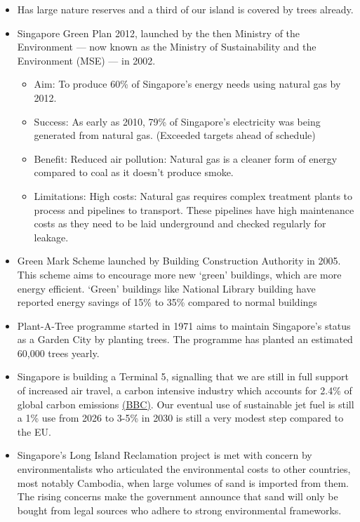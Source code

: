 \documentclass[oneside]{book}
\begin{document}
\begin{enumerate}
\begin{itemize}
\begin{itemize}
            \item Has large nature reserves and a third of our island is covered by trees already.
            \item Singapore Green Plan 2012, launched by the then Ministry of the Environment --- now known as the Ministry of Sustainability and the Environment (MSE) --- in 2002. 
            \begin{itemize}
                \item Aim: To produce 60\% of Singapore's energy needs using natural gas by 2012. 
                \item Success: As early as 2010, 79\% of Singapore's electricity was being generated from natural gas. (Exceeded targets ahead of schedule)
                \item Benefit: Reduced air pollution: Natural gas is a cleaner form of energy compared to coal as it doesn't produce smoke.
                \item Limitations: High costs: Natural gas requires complex treatment plants to process and pipelines to transport. These pipelines have high maintenance costs as they need to be laid underground and checked regularly for leakage. 
            \end{itemize}
            \item Green Mark Scheme launched by Building Construction Authority in 2005. This scheme aims to encourage more new `green' buildings, which are more energy efficient. `Green' buildings like National Library building have reported energy savings of 15\% to 35\% compared to normal buildings
            \item Plant-A-Tree programme started in 1971 aims to maintain Singapore's status as a Garden City by planting trees. The programme has planted an estimated 60,000 trees yearly.
            \item Singapore is building a Terminal 5, signalling that we are still in full support of increased air travel, a carbon intensive industry which accounts for 2.4\% of global carbon emissions \href{https://www.bbc.com/future/article/20200218-climate-change-how-to-cut-your-carbon-emissions-when-flying}{(BBC)}. Our eventual use of sustainable jet fuel is still a 1\% use from 2026 to 3-5\% in 2030 is still a very modest step compared to the EU.
            \item Singapore's Long Island Reclamation project is met with concern by environmentalists who
            articulated the environmental costs to other countries, most notably Cambodia, when large volumes of sand is imported from them. The rising concerns make the government announce that sand will only be bought from legal sources who adhere to strong environmental frameworks.

\end{itemize}
\end{itemize}
\end{enumerate}
\end{document}
